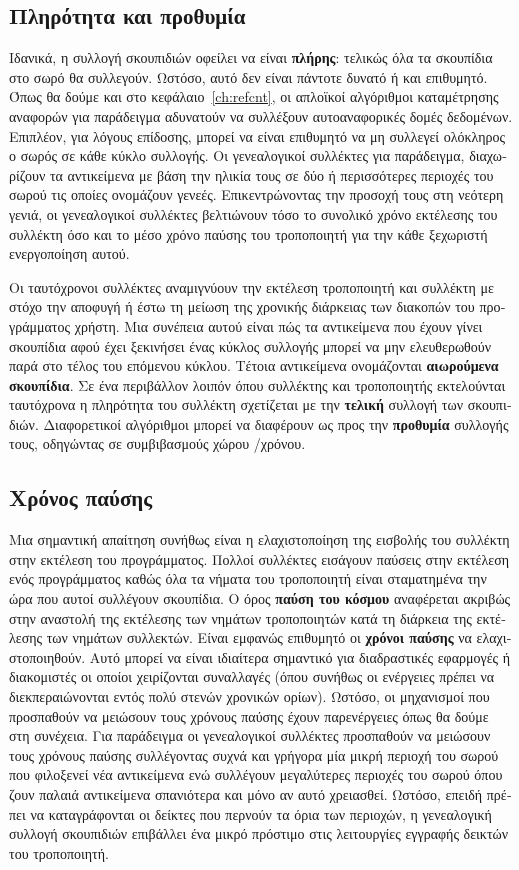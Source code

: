 \begin{greek}
\subsection{Πληρότητα και προθυμία}
Ιδανικά, η συλλογή σκουπιδιών οφείλει να είναι \textbf{πλήρης}: 
τελικώς όλα τα σκουπίδια στο σωρό θα συλλεγούν. Ωστόσο, αυτό
δεν είναι πάντοτε δυνατό ή και επιθυμητό. Όπως θα δούμε και στο
κεφάλαιο~\ref{ch:refcnt}, οι απλοϊκοί αλγόριθμοι καταμέτρησης
αναφορών για παράδειγμα αδυνατούν να συλλέξουν αυτοαναφορικές
δομές δεδομένων. Επιπλέον, για λόγους επίδοσης, μπορεί να είναι 
επιθυμητό να μη συλλεγεί ολόκληρος ο σωρός σε κάθε κύκλο συλλογής.
Οι γενεαλογικοί συλλέκτες για παράδειγμα, διαχωρίζουν τα αντικείμενα
με βάση την ηλικία τους σε δύο ή περισσότερες περιοχές του σωρού
τις οποίες ονομάζουν γενεές. Επικεντρώνοντας την προσοχή τους στη
νεότερη γενιά, οι γενεαλογικοί συλλέκτες βελτιώνουν τόσο το συνολικό
χρόνο εκτέλεσης του συλλέκτη όσο και το μέσο χρόνο παύσης του
τροποποιητή για την κάθε ξεχωριστή ενεργοποίηση αυτού. 

Οι ταυτόχρονοι συλλέκτες αναμιγνύουν την εκτέλεση τροποποιητή
και συλλέκτη με στόχο την αποφυγή ή έστω τη μείωση της χρονικής
διάρκειας των διακοπών του προγράμματος χρήστη. Μια συνέπεια
αυτού είναι πώς τα αντικείμενα που έχουν γίνει σκουπίδια αφού
έχει ξεκινήσει ένας κύκλος συλλογής μπορεί να μην ελευθερωθούν
παρά στο τέλος του επόμενου κύκλου. Τέτοια αντικείμενα ονομάζονται
\textbf{αιωρούμενα σκουπίδια}. Σε ένα περιβάλλον λοιπόν όπου
συλλέκτης και τροποποιητής εκτελούνται ταυτόχρονα η πληρότητα
του συλλέκτη σχετίζεται με την \textbf{τελική} συλλογή των σκουπιδιών. 
Διαφορετικοί αλγόριθμοι μπορεί να διαφέρουν ως προς την 
\textbf{προθυμία} συλλογής τους, οδηγώντας σε συμβιβασμούς χώρου
/χρόνου. 

\subsection{Χρόνος παύσης}
Μια σημαντική απαίτηση συνήθως είναι η ελαχιστοποίηση της εισβολής
του συλλέκτη στην εκτέλεση του προγράμματος. Πολλοί συλλέκτες
εισάγουν παύσεις στην εκτέλεση ενός προγράμματος καθώς όλα τα
νήματα του τροποποιητή είναι σταματημένα την ώρα που αυτοί συλλέγουν
σκουπίδια. Ο όρος \textbf{παύση του κόσμου} αναφέρεται ακριβώς
στην αναστολή της εκτέλεσης των νημάτων τροποποιητών κατά τη
διάρκεια της εκτέλεσης των νημάτων συλλεκτών. Είναι εμφανώς
επιθυμητό οι \textbf{χρόνοι παύσης} να ελαχιστοποιηθούν. Αυτό
μπορεί να είναι ιδιαίτερα σημαντικό για διαδραστικές εφαρμογές
ή διακομιστές οι οποίοι χειρίζονται συναλλαγές (όπου συνήθως οι
ενέργειες πρέπει να διεκπεραιώνονται εντός πολύ στενών χρονικών
ορίων). Ωστόσο, οι μηχανισμοί που προσπαθούν να μειώσουν τους
χρόνους παύσης έχουν παρενέργειες όπως θα δούμε στη συνέχεια.
Για παράδειγμα οι γενεαλογικοί συλλέκτες προσπαθούν να μειώσουν
τους χρόνους παύσης συλλέγοντας συχνά και γρήγορα μία μικρή
περιοχή του σωρού που φιλοξενεί νέα αντικείμενα ενώ συλλέγουν
μεγαλύτερες περιοχές του σωρού όπου ζουν παλαιά αντικείμενα
σπανιότερα και μόνο αν αυτό χρειασθεί. Ωστόσο, επειδή πρέπει
να καταγράφονται οι δείκτες που περνούν τα όρια των περιοχών,
η γενεαλογική συλλογή σκουπιδιών επιβάλλει ένα μικρό πρόστιμο
στις λειτουργίες εγγραφής δεικτών του τροποποιητή.


\end{greek}
